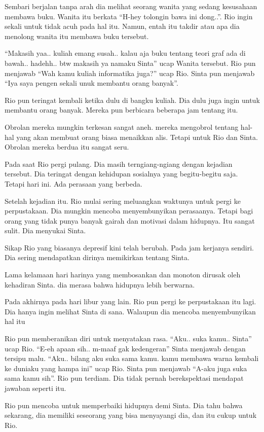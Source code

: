 Sembari berjalan tanpa arah dia melihat seorang wanita yang sedang kesusahaan membawa buku. Wanita itu berkata ``H-hey tolongin bawa ini dong..''. Rio ingin sekali untuk tidak acuh pada hal itu. Namun, entah itu takdir atau apa dia menolong wanita itu membawa buku tersebut.


``Makasih yaa.. kuliah emang susah.. kalau aja buku tentang teori graf ada di bawah.. hadehh.. btw makasih ya namaku Sinta'' ucap Wanita tersebut. Rio pun menjawab ``Wah kamu kuliah informatika juga?'' ucap Rio. Sinta pun menjawab ``Iya saya pengen sekali unuk membantu orang banyak''.


Rio pun teringat kembali ketika dulu di bangku kuliah. Dia dulu juga ingin untuk membantu orang banyak. Mereka pun berbicara beberapa jam tentang itu.


Obrolan mereka mungkin terkesan sangat aneh. mereka mengobrol tentang hal-hal yang akan membuat orang biasa menaikkan alis. Tetapi untuk Rio dan Sinta. Obrolan mereka berdua itu sangat seru.


Pada saat Rio pergi pulang. Dia masih terngiang-ngiang dengan kejadian tersebut. Dia teringat dengan kehidupan sosialnya yang begitu-begitu saja. Tetapi hari ini. Ada perasaan yang berbeda.


Setelah kejadian itu. Rio mulai sering meluangkan waktunya untuk pergi ke perpustakaan. Dia mungkin mencoba menyembunyikan perasaanya. Tetapi bagi orang yang tidak punya banyak gairah dan motivasi dalam hidupnya. Itu sangat sulit. Dia menyukai Sinta.


Sikap Rio yang biasanya depresif kini telah berubah. Pada jam kerjanya sendiri. Dia sering mendapatkan dirinya memikirkan tentang Sinta.


Lama kelamaan hari harinya yang membosankan dan monoton dirusak oleh kehadiran Sinta. dia merasa bahwa hidupnya lebih berwarna.


Pada akhirnya pada hari libur yang lain. Rio pun pergi ke perpustakaan itu lagi. Dia hanya ingin melihat Sinta di sana. Walaupun dia mencoba menyembunyikan hal itu


Rio pun memberanikan diri untuk menyatakan rasa. ``Aku.. suka kamu.. Sinta'' ucap Rio. ``E-eh apaan sih.. m-maaf gak kedengeran'' Sinta menjawab dengan tersipu malu. ``Aku.. bilang aku suka sama kamu. kamu membawa warna kembali ke duniaku yang hampa ini'' ucap Rio. Sinta pun menjawab ``A-aku juga suka sama kamu sih''. Rio pun terdiam. Dia tidak pernah berekspektasi mendapat jawaban seperti itu.


Rio pun mencoba untuk memperbaiki hidupnya demi Sinta. Dia tahu bahwa sekarang, dia memiliki seseorang yang bisa menyayangi dia, dan itu cukup untuk Rio.
\jedahias 

